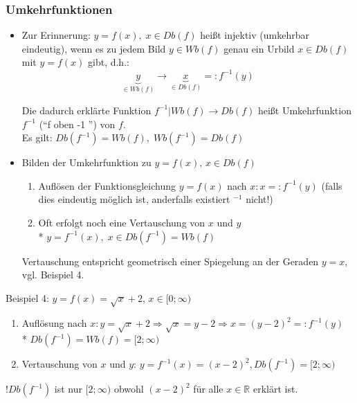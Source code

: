 \documentclass[a4paper]{scrartcl}
\begin{document}
\subsubsection{Umkehrfunktionen}
\begin{itemize}
\item Zur Erinnerung: $y=f(x), \; x \in Db(f)$ heißt injektiv (umkehrbar eindeutig), wenn es zu jedem Bild $y \in Wb(f)$ genau ein Urbild $x \in Db(f)$ mit $ y=f(x)$ gibt, d.h.:
\[ \underbrace{y}_{\in Wb(f)} \longrightarrow \underbrace{x}_{\in Db(f)} =: f^{-1} (y)\]

Die dadurch erklärte Funktion $f^{-1} \vert Wb(f) \rightarrow Db(f)$ heißt Umkehrfunktion $f^{-1}$ ("`f oben -1 "') von $f$.\\
Es gilt: $Db(f^{-1}) = Wb(f), \; Wb(f^{-1} ) = Db(f)$
\item Bilden der Umkehrfunktion zu $y=f(x),\, x \in Db(f)$
\begin{enumerate}
\item Auflösen der Funktionsgleichung $y=f(x)$ nach $x: x=: f^{-1}(y)$ (falls dies eindeutig möglich ist, anderfalls existiert $^{-1}$ nicht!)
\item Oft erfolgt noch eine Vertauschung von $x$ und $y$\\*
$y=f^{-1}(x), \; x \in Db(f^{-1}) = Wb(f)$
\end{enumerate}
Vertauschung entspricht geometrisch einer Spiegelung an der Geraden $y=x$, vgl. Beispiel 4.
\end{itemize}

Beispiel 4: $y=f(x) = \sqrt{x} + 2, \, x \in [ 0 ; \infty)$
\begin{enumerate}
\item Auflösung nach $x: y=\sqrt{x} + 2 \Rightarrow \sqrt{x} = y-2 \Rightarrow  x= (y-2)^2 =: f^{-1}(y)$\\*
$Db(f^{-1}) = Wb(f) = [2;\infty )$
\item Vertauschung von $x$ und $y$: $y= f^{-1}(x) = (x-2)^2, Db(f^{-1})=[2;\infty)$
\end{enumerate}

 !$Db(f^{-1})$ ist nur $[2;\infty)$ obwohl $(x-2)^2$ für alle $x \in \mathbb{R}$ erklärt ist.
\end{document}
